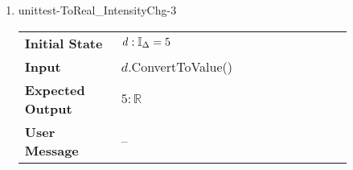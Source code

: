 \begin{enumerate}
    \item{unittest-ToReal\_IntensityChg-3}
    \begin{table}[H]
        \centering
        \begin{tabular}{P{0.25\linewidth}P{0.6\linewidth}}
            \toprule
            \textbf{Initial State} & $\mathit{d} : \mathbb{I}_{\Delta} = 5$ \\
            \textbf{Input} & $\mathit{d}$.ConvertToValue() \\
            \midrule
            \textbf{Expected Output} & $5 : \mathbb{R}$ \\
            \textbf{User Message} & -- \\ \bottomrule
        \end{tabular}
    \end{table}

\end{enumerate}
